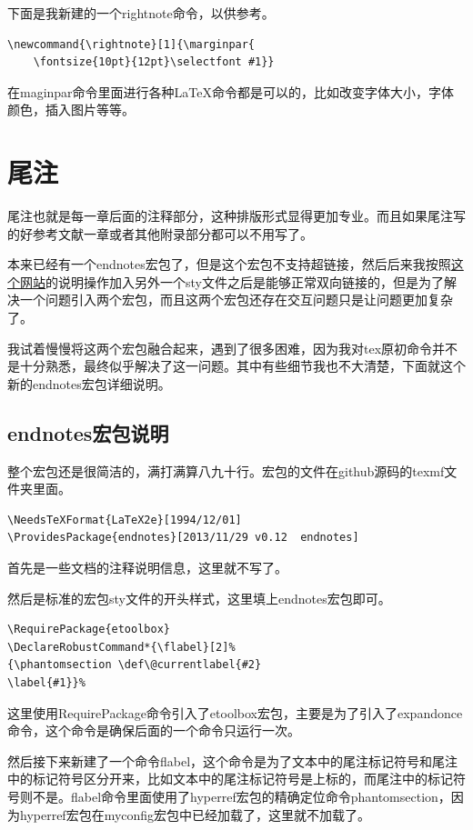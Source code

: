\documentclass[12pt,oneside]{book}
\begin{document}
\begin{common-format}
下面是我新建的一个rightnote命令，以供参考。
\begin{Verbatim}
\newcommand{\rightnote}[1]{\marginpar{  
 	\fontsize{10pt}{12pt}\selectfont #1}}
\end{Verbatim}

在maginpar命令里面进行各种\LaTeX 命令都是可以的，比如改变字体大小，字体颜色，插入图片等等。



\section{尾注}
尾注也就是每一章后面的注释部分，这种排版形式显得更加专业。而且如果尾注写的好参考文献一章或者其他附录部分都可以不用写了。

本来已经有一个endnotes宏包了，但是这个宏包不支持超链接，然后后来我按照\href{http://tex.stackexchange.com/questions/8452/making-endnotes-clickable-links-with-hyperref}{这个网站}的说明操作加入另外一个sty文件之后是能够正常双向链接的，但是为了解决一个问题引入两个宏包，而且这两个宏包还存在交互问题只是让问题更加复杂了。

我试着慢慢将这两个宏包融合起来，遇到了很多困难，因为我对tex原初命令并不是十分熟悉，最终似乎解决了这一问题。其中有些细节我也不大清楚，下面就这个新的endnotes宏包详细说明。


\subsection{endnotes宏包说明}
整个宏包还是很简洁的，满打满算八九十行。宏包的文件在github源码的texmf文件夹里面。


\begin{Verbatim}
\NeedsTeXFormat{LaTeX2e}[1994/12/01]
\ProvidesPackage{endnotes}[2013/11/29 v0.12  endnotes]
\end{Verbatim}
首先是一些文档的注释说明信息，这里就不写了。

然后是标准的宏包sty文件的开头样式，这里填上endnotes宏包即可。

\begin{Verbatim}
\RequirePackage{etoolbox}
\DeclareRobustCommand*{\flabel}[2]%
{\phantomsection \def\@currentlabel{#2}
\label{#1}}%
\end{Verbatim}

这里使用RequirePackage命令引入了etoolbox宏包，主要是为了引入了expandonce命令，这个命令是确保后面的一个命令只运行一次。

然后接下来新建了一个命令flabel，这个命令是为了文本中的尾注标记符号和尾注中的标记符号区分开来，比如文本中的尾注标记符号是上标的，而尾注中的标记符号则不是。flabel命令里面使用了hyperref宏包的精确定位命令phantomsection，因为hyperref宏包在myconfig宏包中已经加载了，这里就不加载了。


\end{common-format}
\end{document}
